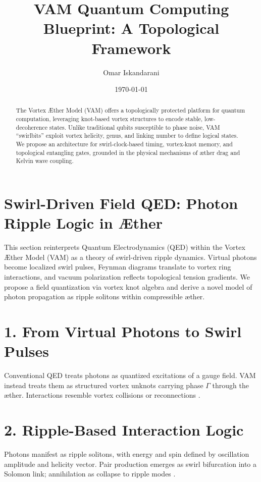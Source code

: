 \documentclass[a4paper,11pt]{article}
\title{VAM Quantum Computing Blueprint: A Topological Framework}
\author{Omar Iskandarani}
\date{\today}
\begin{document}
\maketitle

\begin{abstract}
The Vortex Æther Model (VAM) offers a topologically protected platform for quantum computation, leveraging knot-based vortex structures to encode stable, low-decoherence states. Unlike traditional qubits susceptible to phase noise, VAM ``swirlbits'' exploit vortex helicity, genus, and linking number to define logical states. We propose an architecture for swirl-clock-based timing, vortex-knot memory, and topological entangling gates, grounded in the physical mechanisms of æther drag and Kelvin wave coupling.
\end{abstract}

\section{Swirl-Driven Field QED: Photon Ripple Logic in Æther}

This section reinterprets Quantum Electrodynamics (QED) within the Vortex Æther Model (VAM) as a theory of swirl-driven ripple dynamics. Virtual photons become localized swirl pulses, Feynman diagrams translate to vortex ring interactions, and vacuum polarization reflects topological tension gradients. We propose a field quantization via vortex knot algebra and derive a novel model of photon propagation as ripple solitons within compressible æther.


\section*{1. From Virtual Photons to Swirl Pulses}
Conventional QED treats photons as quantized excitations of a gauge field. VAM instead treats them as structured vortex unknots carrying phase \( \Gamma \) through the æther. Interactions resemble vortex collisions or reconnections \cite{Iskandarani2025,Wilczek1998}.

\section*{2. Ripple-Based Interaction Logic}
Photons manifest as ripple solitons, with energy and spin defined by oscillation amplitude and helicity vector. Pair production emerges as swirl bifurcation into a Solomon link; annihilation as collapse to ripple modes \cite{Berloff2014,Schwarz1985}.
\end{document}
